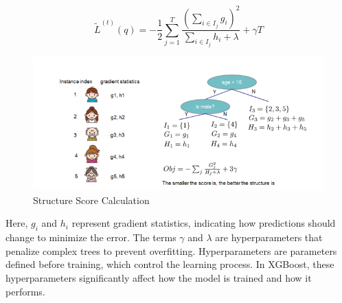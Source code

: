 \documentclass{SGGW-thesis-EN}
\begin{document}
\begin{figure}[h!]
  \centering
  \begin{minipage}[c]{0.4\textwidth}
      \centering
    \[
    \tilde{L}^{(t)}(q) = -\frac{1}{2}\sum_{j=1}^{T}\frac{(\sum_{i \in I_j} g_i)^2}{\sum_{i \in I_j} h_i + \lambda} + \gamma T
    \]
  \end{minipage}\hfill
  \begin{minipage}[c]{0.55\textwidth}
      \centering
      \includegraphics[width=\linewidth]{images/Structure score calculation.png}
      \caption{Structure Score Calculation \cite{Chen_2016}}
      \label{fig:Structure_score_calculation}
  \end{minipage}
\end{figure}
Here, $g_i$ and $h_i$ represent gradient statistics, indicating how predictions should change to minimize the error. The terms $\gamma$ and $\lambda$ are hyperparameters that penalize complex trees to prevent overfitting.
Hyperparameters are parameters defined before training, which control the learning process.  
In XGBoost, these hyperparameters significantly affect how the model is trained and how it performs.
\end{document}
